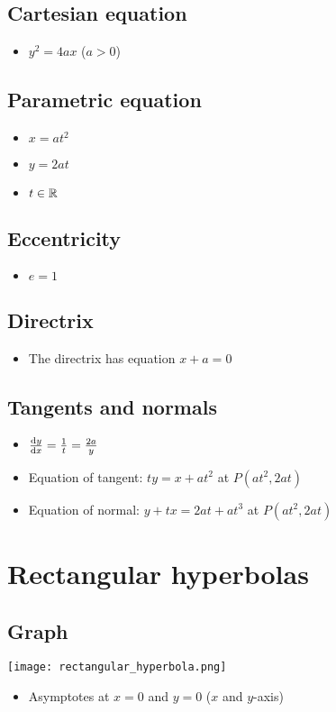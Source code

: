 \subsection{Cartesian equation}
\begin{itemize}
    \item $y^2=4ax$ ($a>0$)
\end{itemize}
\subsection{Parametric equation}
\begin{itemize}
    \item $x=at^2$
    \item $y=2at$
    \item $t\in \operatorname{\mathbb{R}}$
\end{itemize}
\subsection{Eccentricity}
\begin{itemize}
    \item $e=1$
\end{itemize}
\subsection{Directrix}
\begin{itemize}
    \item The directrix has equation $x+a=0$
\end{itemize}
\subsection{Tangents and normals}
\begin{itemize}
    \item $\dv{y}{x} = \frac{1}{t} = \frac{2a}{y}$
    \item Equation of tangent: $ty=x+at^2$ at $P(at^2, 2at)$
    \item Equation of normal: $y+tx=2at+at^3$ at $P(at^2, 2at)$
\end{itemize}

\section{Rectangular hyperbolas}
\subsection{Graph}
\texttt{[image: rectangular\_hyperbola.png]}
\begin{itemize}
    \item Asymptotes at $x=0$ and $y=0$ ($x$ and $y$-axis)
\end{itemize}
